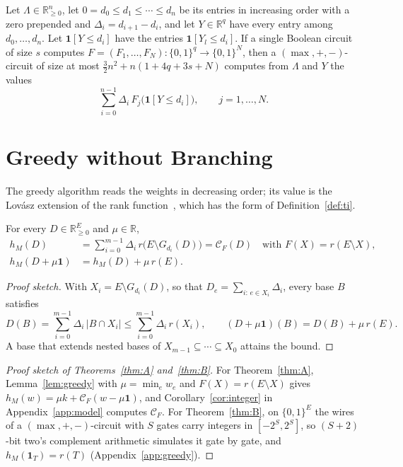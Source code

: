 \documentclass[runningheads,envcountsame]{llncs}
\newcommand{\R}{\mathbb R}
\newcommand{\CC}{\mathcal C}
\begin{document}
\begin{corollary}
\label{cor:levels}
Let $\Lambda\in\R^{n}_{\ge0}$, let $0=d_0\le d_1\le\cdots\le d_n$ be its entries in
increasing order with a zero prepended and $\Delta_i=d_{i+1}-d_i$, and let
$Y\in\R^{q}$ have every entry among $d_0,\ldots,d_n$.  Let $\mathbf 1[Y\le d_i]$ have the entries $\mathbf 1[Y_l\le d_i]$.  If a single
Boolean circuit of size $s$ computes $F=(F_1,\ldots,F_N):\{0,1\}^{q}\to\{0,1\}^{N}$,
then a $(\max,+,-)$-circuit of size at most $\frac32n^{2}+n(1+4q+3s+N)$ computes
from $\Lambda$ and $Y$ the values
\[
  \sum_{i=0}^{n-1}\Delta_i\,F_j\bigl(\mathbf 1[Y\le d_i]\bigr),\qquad j=1,\ldots,N.
\]
\end{corollary}

\section{Greedy without Branching}
\label{sec:greedy}

The greedy algorithm reads the weights in decreasing order; its value is the
Lov\'asz extension of the rank function~\cite{edmonds70,lovasz83}, which has the
form of Definition~\ref{def:ti}.

\begin{lemma}
\label{lem:greedy}
For every $D\in\R^{E}_{\ge0}$ and $\mu\in\R$,
\begin{align*}
  h_M(D)&=\sum_{i=0}^{m-1}\Delta_i\,r\bigl(E\setminus G_{d_i}(D)\bigr)=\CC_F(D)
  \quad\text{with }F(X)=r(E\setminus X),\\
  h_M(D+\mu\mathbf 1)&=h_M(D)+\mu\,r(E).
\end{align*}
\end{lemma}

\begin{proof}[Proof sketch]
With $X_i=E\setminus G_{d_i}(D)$, so that $D_e=\sum_{i:\,e\in X_i}\Delta_i$, every
base $B$ satisfies
\[
  D(B)=\sum_{i=0}^{m-1}\Delta_i\,|B\cap X_i|\le\sum_{i=0}^{m-1}\Delta_i\,r(X_i),\qquad
  (D+\mu\mathbf 1)(B)=D(B)+\mu\,r(E).
\]
A base that extends nested bases of $X_{m-1}\subseteq\cdots\subseteq X_0$
attains the bound.
\end{proof}

\begin{proof}[Proof sketch of Theorems~\ref{thm:A} and~\ref{thm:B}]
For Theorem~\ref{thm:A}, Lemma~\ref{lem:greedy} with $\mu=\min_ew_e$ and
$F(X)=r(E\setminus X)$ gives $h_M(w)=\mu k+\CC_F(w-\mu\mathbf 1)$, and
Corollary~\ref{cor:integer} in Appendix~\ref{app:model} computes $\CC_F$.  For
Theorem~\ref{thm:B}, on $\{0,1\}^{E}$ the wires of a $(\max,+,-)$-circuit with $S$
gates carry integers in $[-2^{S},2^{S}]$, so $(S+2)$-bit two's complement
arithmetic simulates it gate by gate, and $h_M(\mathbf 1_T)=r(T)$
(Appendix~\ref{app:greedy}).
\end{proof}
\end{document}
